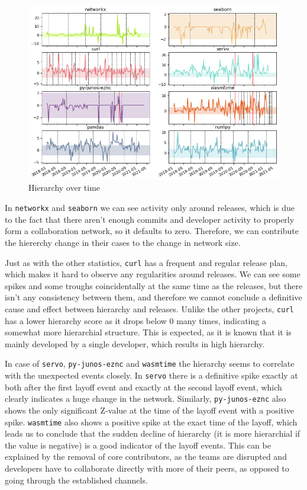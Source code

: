 \begin{figure}
    \centering
    \includegraphics[width=\textwidth]{figures/qualitative/hierarchy/hierarchy_all_z.png}
    \caption{Hierarchy over time}
    \label{fig:hierarchy_all}
\end{figure}

In \texttt{networkx} and \texttt{seaborn} we can see activity only around releases, which is due to the fact that there aren't enough commits and developer activity to properly form a collaboration network, so it defaults to zero. Therefore, we can contribute the hiererchy change in their cases to the change in network size.

Just as with the other statistics, \texttt{curl} has a frequent and regular release plan, which makes it hard to observe any regularities around releases. We can see some spikes and some troughs coincidentally at the same time as the releases, but there isn't any consistency between them, and therefore we cannot conclude a definitive cause and effect between hierarchy and releases. Unlike the other projects, \texttt{curl} has a lower hierarchy score as it drops below $0$ many times, indicating a somewhat more hierarchial structure. This is expected, as it is known that it is mainly developed by a single developer, which results in high hierarchy.

In case of \texttt{servo}, \texttt{py-junos-eznc} and \texttt{wasmtime} the hierarchy seems to correlate with the unexpected events closely. In \texttt{servo} there is a definitive spike exactly at both after the first layoff event and exactly at the second layoff event, which clearly indicates a huge change in the network. Similarly, \texttt{py-junos-eznc} also shows the only significant Z-value at the time of the layoff event with a positive spike. \texttt{wasmtime} also shows a positive spike at the exact time of the layoff, which leads us to conclude that the sudden decline of hierarchy (it is more hierarchial if the value is negative) is a good indicator of the layoff events. This can be explained by the removal of core contributors, as the teams are disrupted and developers have to collaborate directly with more of their peers, as opposed to going through the established channels.

